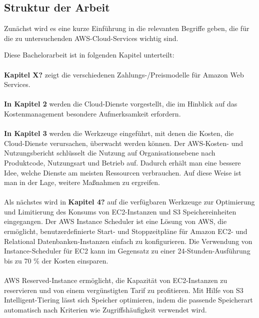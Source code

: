 \subsection{Struktur der Arbeit}
Zunächst wird es eine kurze Einführung in die relevanten Begriffe geben, die für die zu untersuchenden AWS-Cloud-Services wichtig sind.

Diese Bachelorarbeit ist in folgenden Kapitel unterteilt:\\\\
\textbf{Kapitel X?} 
zeigt die verschiedenen Zahlungs-/Preismodelle für Amazon Web Services. 
\\\\
\textbf{In Kapitel 2} werden die Cloud-Dienste vorgestellt, die im Hinblick auf das Kostenmanagement besondere Aufmerksamkeit erfordern.
\\\\
\textbf{In Kapitel 3} werden die Werkzeuge eingeführt, mit denen die Kosten, die Cloud-Dienste verursachen, überwacht werden können. Der AWS-Kosten- und Nutzungsbericht schlüsselt die Nutzung auf Organisationsebene nach Produktcode, Nutzungsart und Betrieb auf. Dadurch erhält man eine bessere Idee, welche Dienste am meisten Ressourcen verbrauchen. Auf diese Weise ist man in der Lage, weitere Maßnahmen zu ergreifen.
\\\\
Als nächstes wird in \textbf{Kapitel 4?} auf die verfügbaren Werkzeuge zur Optimierung und Limitierung des Konsums von EC2-Instanzen und S3 Speichereinheiten eingegangen. Der AWS Instance Scheduler ist eine Lösung von AWS, die ermöglicht, benutzerdefinierte Start- und Stoppzeitpläne für Amazon EC2- und Relational Datenbanken-Instanzen einfach zu konfigurieren. Die Verwendung von Instance-Scheduler für EC2 kann im Gegensatz zu einer 24-Stunden-Ausführung bis zu 70 \% der Kosten einsparen.
\\\\
AWS Reserved-Instance ermöglicht, die Kapazität von EC2-Instanzen zu reservieren und von einem vergünstigten Tarif zu profitieren. Mit Hilfe von S3 Intelligent-Tiering lässt sich Speicher optimieren, indem die passende Speicherart automatisch nach Kriterien wie Zugriffshäufigkeit verwendet wird.
\\\\
 
